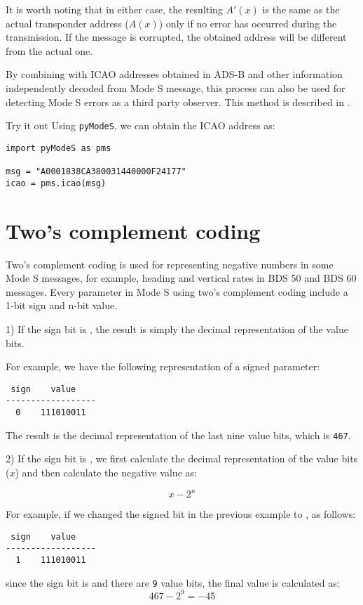 It is worth noting that in either case, the resulting $A'(x)$ is the same as the actual transponder address ($A(x)$) only if no error has occurred during the transmission. If the message is corrupted, the obtained address will be different from the actual one.

By combining with ICAO addresses obtained in ADS-B and other information independently decoded from Mode S message, this process can also be used for detecting Mode S errors as a third party observer. This method is described in \cite{sun2019pymodes}.

\begin{notebox}{Try it out}
Using \texttt{pyModeS}, we can obtain the ICAO address as: 

\begin{verbatim}
import pyModeS as pms

msg = "A0001838CA380031440000F24177"
icao = pms.icao(msg)
\end{verbatim}

\end{notebox}

\section{Two's complement coding} \label{sec:two_complement}

Two's complement coding is used for representing negative numbers in some Mode S messages, for example, heading and vertical rates in BDS 50 and BDS 60 messages. Every parameter in Mode S using two's complement coding include a 1-bit sign and n-bit value.

1) If the sign bit is \0, the result is simply the decimal representation of the value bits.

For example, we have the following representation of a signed parameter:

\begin{verbatim}
 sign    value
------------------
  0    111010011
\end{verbatim}

The result is the decimal representation of the last nine value bits, which is \texttt{467}.


2) If the sign bit is \1, we first calculate the decimal representation of the value bits ($x$) and then calculate the negative value as:

\begin{equation}
  x - 2^n
\end{equation}

For example, if we changed the signed bit in the previous example to \1, as follows:

\begin{verbatim}
 sign    value
------------------
  1    111010011
\end{verbatim}

since the sign bit is \1 and there are \texttt{9} value bits, the final value is calculated as:
\begin{equation}
  467 - 2^9 = -45
\end{equation}
